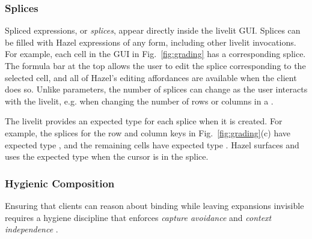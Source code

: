 \subsubsection{Splices}\label{sec:splices}
Spliced expressions, or \emph{splices}, appear directly inside the livelit GUI.
Splices can be filled with Hazel expressions of any form, including other livelit invocations.
For example, each cell in the  GUI in Fig.~\ref{fig:grading}
has a corresponding splice. The formula bar at the top 
allows the user to edit the splice corresponding to the selected cell,
and all of Hazel's editing affordances are available when the client does so.
Unlike parameters, the number of splices can change 
as the user interacts with the livelit, e.g. when changing the number of rows or columns in a .

The livelit provides an expected type for each splice when it is created.
For example, the splices for the row and column keys in Fig.~\ref{fig:grading}(c) have expected type , 
and the remaining cells have expected type .
Hazel surfaces and uses the expected type when the cursor is in the splice.


\subsubsection{Hygienic Composition}\label{sec:hygiene}
 

Ensuring that clients can reason about binding while leaving expansions
 invisible 
 requires a hygiene discipline that enforces \emph{capture avoidance}
and \emph{context independence} \cite{TLMs}.


